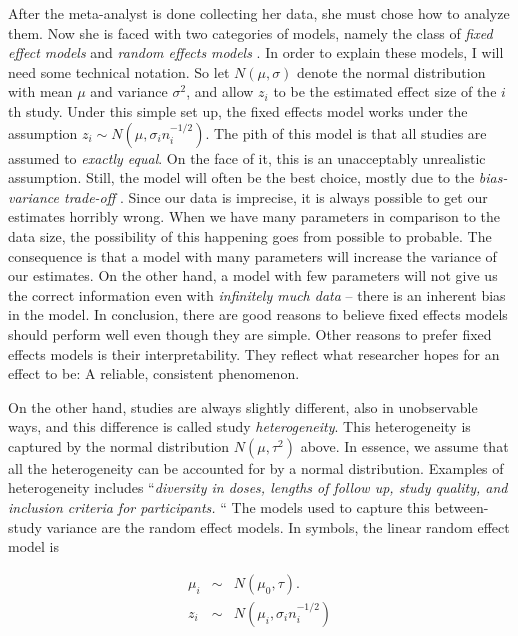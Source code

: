 After the meta-analyst is done collecting her data, she must chose
how to analyze them. Now she is faced with two categories of models,
namely the class of \emph{fixed effect models} and \emph{random effects
models} \parencite[chapter 10]{borenstein_introduction_2009}. In order
to explain these models, I will need some technical notation. So let
$N(\mu,\sigma)$ denote the normal distribution with mean $\mu$ and
variance $\sigma^{2}$, and allow $z_{i}$ to be the estimated effect
size of the $i$th study. Under this simple set up, the fixed effects
model works under the assumption $z_{i}\sim N(\mu,\sigma_{i}n_{i}^{-1/2})$.
The pith of this model is that all studies are assumed to \emph{exactly
equal}. On the face of it, this is an unacceptably unrealistic assumption.
Still, the model will often be the best choice, mostly due to the\emph{
bias-variance trade-off} \parencite[p. 37]{friedman_elements_2001}. Since
our data is imprecise, it is always possible to get our estimates
horribly wrong. When we have many parameters in comparison to the
data size, the possibility of this happening goes from possible to
probable. The consequence is that a model with many parameters will
increase the variance of our estimates. On the other hand, a model
with few parameters will not give us the correct information even
with \emph{infinitely much data} -- there is an inherent bias in
the model. In conclusion, there are good reasons to believe fixed
effects models should perform well even though they are simple. Other
reasons to prefer fixed effects models is their interpretability.
They reflect what researcher hopes for an effect to be: A reliable,
consistent phenomenon. 

On the other hand, studies are always slightly different, also in
unobservable ways, and this difference is called study \emph{heterogeneity}.
This heterogeneity is captured by the normal distribution $N\left(\mu,\tau^{2}\right)$
above. In essence, we assume that all the heterogeneity can be accounted
for by a normal distribution. Examples of heterogeneity includes ``\emph{diversity
in doses, lengths of follow up, study quality, and inclusion criteria
for participants.} \parencite{higgins_measuring_2003}`` The models used
to capture this between-study variance are the random effect models.
In symbols, the linear random effect model is

\begin{eqnarray}
\mu_{i} & \sim & N(\mu_{0},\tau).\label{eq:Random effects}\\
z_{i} & \sim & N(\mu_{i},\sigma_{i}n_{i}^{-1/2})\nonumber 
\end{eqnarray}

